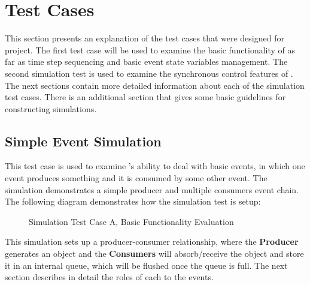 \chapter{Test Cases}
\label{example}
This section presents an explanation of the test cases that were
designed for \dispare project.  
The first test case will be used to examine the basic functionality
of \dispare as far as time step sequencing and  basic event state 
variables 
management. The second simulation test is used to examine
the synchronous control features of \dispare.  The next sections contain
more detailed information about each of the simulation test cases. There is
an additional section that gives some basic guidelines for constructing 
simulations.
 
\section{Simple Event Simulation}
This test case is used to  examine \dispare's ability to
deal with basic events, in which one event produces something and it is
consumed by some other event.  The simulation demonstrates a simple producer
and multiple consumers event chain.  The following diagram
demonstrates how the simulation test is setup:
 
\begin{figure}
\label{simtestA}
\centerline{}
\caption{ Simulation Test Case A, Basic Functionality Evaluation}
\end{figure}

 
This simulation sets up a producer-consumer relationship, where the
{\bf Producer} generates an object and the {\bf Consumers} will
absorb/receive the object and store it in an internal queue, which will
be flushed once the queue is full.  The next section describes
in detail the roles of each to the events.
 
